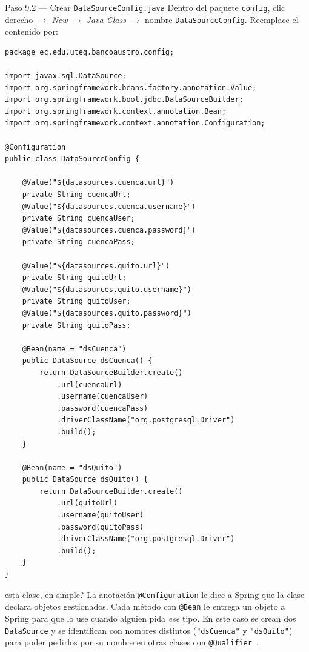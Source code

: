 \documentclass[11pt,a4paper]{article}
\begin{document}
\begin{pasobox}{Paso 9.2 --- Crear \texttt{DataSourceConfig.java}}
Dentro del paquete \texttt{config}, clic derecho $\rightarrow$ \emph{New} $\rightarrow$ \emph{Java Class} $\rightarrow$ nombre \texttt{DataSourceConfig}. Reemplace el contenido por:

\begin{lstlisting}[style=javastyle,caption={config/DataSourceConfig.java}]
package ec.edu.uteq.bancoaustro.config;

import javax.sql.DataSource;
import org.springframework.beans.factory.annotation.Value;
import org.springframework.boot.jdbc.DataSourceBuilder;
import org.springframework.context.annotation.Bean;
import org.springframework.context.annotation.Configuration;

@Configuration
public class DataSourceConfig {

    @Value("${datasources.cuenca.url}")
    private String cuencaUrl;
    @Value("${datasources.cuenca.username}")
    private String cuencaUser;
    @Value("${datasources.cuenca.password}")
    private String cuencaPass;

    @Value("${datasources.quito.url}")
    private String quitoUrl;
    @Value("${datasources.quito.username}")
    private String quitoUser;
    @Value("${datasources.quito.password}")
    private String quitoPass;

    @Bean(name = "dsCuenca")
    public DataSource dsCuenca() {
        return DataSourceBuilder.create()
            .url(cuencaUrl)
            .username(cuencaUser)
            .password(cuencaPass)
            .driverClassName("org.postgresql.Driver")
            .build();
    }

    @Bean(name = "dsQuito")
    public DataSource dsQuito() {
        return DataSourceBuilder.create()
            .url(quitoUrl)
            .username(quitoUser)
            .password(quitoPass)
            .driverClassName("org.postgresql.Driver")
            .build();
    }
}
\end{lstlisting}
\end{pasobox}

\begin{conceptobox}{esta clase, en simple?}
La anotaci\'on \texttt{@Configuration} le dice a Spring que la clase declara objetos gestionados. Cada m\'etodo con \texttt{@Bean} le entrega un objeto a Spring para que lo use cuando alguien pida \emph{ese} tipo. En este caso se crean dos \texttt{DataSource} y se identifican con nombres distintos (\texttt{"dsCuenca"} y \texttt{"dsQuito"}) para poder pedirlos por su nombre en otras clases con \texttt{@Qualifier}~\cite{SpringBoot2024}.
\end{conceptobox}
\end{document}
